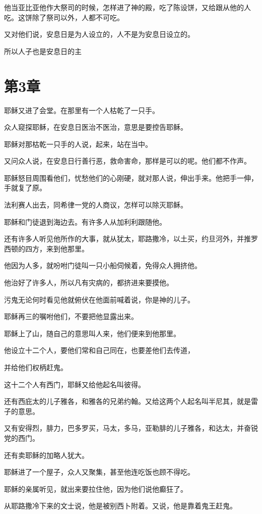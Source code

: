 \documentclass[12pt,oneside]{book}
\begin{document}
他当亚比亚他作大祭司的时候，怎样进了神的殿，吃了陈设饼，又给跟从他的人吃。这饼除了祭司以外，人都不可吃。

又对他们说，安息日是为人设立的，人不是为安息日设立的。

所以人子也是安息日的主

\chapter{第3章}
耶稣又进了会堂。在那里有一个人枯乾了一只手。

众人窥探耶稣，在安息日医治不医治，意思是要控告耶稣。

耶稣对那枯乾一只手的人说，起来，站在当中。

又问众人说，在安息日行善行恶，救命害命，那样是可以的呢。他们都不作声。

耶稣怒目周围看他们，忧愁他们的心刚硬，就对那人说，伸出手来。他把手一伸，手就复了原。

法利赛人出去，同希律一党的人商议，怎样可以除灭耶稣。

耶稣和门徒退到海边去。有许多人从加利利跟随他。

还有许多人听见他所作的大事，就从犹太，耶路撒冷，以土买，约旦河外，并推罗西顿的四方，来到他那里。

他因为人多，就吩咐门徒叫一只小船伺候着，免得众人拥挤他。

他治好了许多人，所以凡有灾病的，都挤进来要摸他。

污鬼无论何时看见他就俯伏在他面前喊着说，你是神的儿子。

耶稣再三的嘱咐他们，不要把他显露出来。

耶稣上了山，随自己的意思叫人来，他们便来到他那里。

他设立十二个人，要他们常和自己同在，也要差他们去传道，

并给他们权柄赶鬼。

这十二个人有西门，耶稣又给他起名叫彼得。

还有西庇太的儿子雅各，和雅各的兄弟约翰。又给这两个人起名叫半尼其，就是雷子的意思。

又有安得烈，腓力，巴多罗买，马太，多马，亚勒腓的儿子雅各，和达太，并奋锐党的西门。

还有卖耶稣的加略人犹大。

耶稣进了一个屋子，众人又聚集，甚至他连吃饭也顾不得吃。

耶稣的亲属听见，就出来要拉住他，因为他们说他癫狂了。

从耶路撒冷下来的文士说，他是被别西卜附着。又说，他是靠着鬼王赶鬼。
\end{document}
